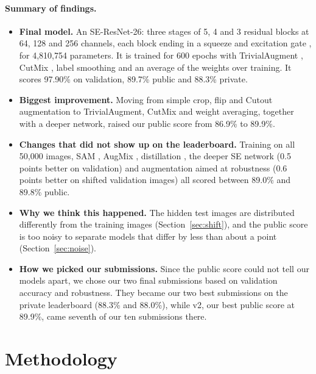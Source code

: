 \documentclass{article}
\begin{document}
\paragraph{Summary of findings.}
\begin{itemize}
  \item \textbf{Final model.} An SE-ResNet-26: three stages of 5, 4 and 3 residual blocks at 64, 128 and 256 channels,
  each block ending in a squeeze and excitation gate \citep{hu2018se}, for 4,810,754 parameters. It is trained for 600
  epochs with TrivialAugment \citep{muller2021trivialaugment}, CutMix \citep{yun2019cutmix}, label smoothing and an average
  of the weights over training. It scores 97.90\% on validation, 89.7\% public and 88.3\% private.
  \item \textbf{Biggest improvement.} Moving from simple crop, flip and Cutout augmentation to TrivialAugment, CutMix and
  weight averaging, together with a deeper network, raised our public score from 86.9\% to 89.9\%.
  \item \textbf{Changes that did not show up on the leaderboard.} Training on all 50,000 images, SAM \citep{foret2021sam},
  AugMix \citep{hendrycks2020augmix}, distillation \citep{hinton2015distilling}, the deeper SE network (0.5 points better on
  validation) and augmentation aimed at robustness (0.6 points better on shifted validation images) all scored between
  89.0\% and 89.8\% public.
  \item \textbf{Why we think this happened.} The hidden test images are distributed differently from the training images
  (Section~\ref{sec:shift}), and the public score is too noisy to separate models that differ by less than about a point
  (Section~\ref{sec:noise}).
  \item \textbf{How we picked our submissions.} Since the public score could not tell our models apart, we chose our two
  final submissions based on validation accuracy and robustness. They became our two best submissions on the private
  leaderboard (88.3\% and 88.0\%), while v2, our best public score at 89.9\%, came seventh of our ten submissions there.
\end{itemize}

\section{Methodology}
\end{document}
